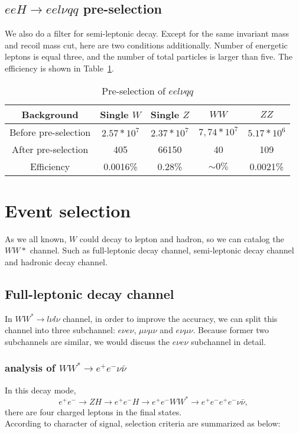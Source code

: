 \documentclass[11pt,a4paper]{cepcnote}
\begin{document}
\subsection{$eeH\rightarrow eel\nu qq$ pre-selection}
We also do a filter for semi-leptonic decay. Except for the same invariant mass and recoil mass cut,
here are two conditions additionally.
Number of energetic leptons is equal three, and the number of total particles is larger than five.
The efficiency is shown in Table~\ref{tab:eehsemi}.
\begin{table}[H]
  \begin{center}
    \begin{tabular}{ccccc}
      \hline \hline
      \multicolumn{1}{c}{Background}      & \multicolumn{1}{c}{Single $W$}&\multicolumn{1}{c}{Single $Z$}
	  &\multicolumn{1}{c}{$WW$}	&\multicolumn{1}{c}{$ZZ$}\\ 
      \hline
      Before pre-selection& $2.57*10^7$ & $2.37*10^7$	&  $7,74*10^7$	&  $5.17*10^6$\\
      \hline
      After pre-selection &  405		 & 	66150		&  40			&  109\\
      \hline
      Efficiency         			&  0.0016\%  &   0.28\%		& $\sim 0\%$	&  0.0021\%\\
      \hline \hline
    \end{tabular}
   \caption[Monte Carlo purities in the single lepton sample]{Pre-selection of $ee l\nu qq$}
  \label{tab:eehsemi}
 \end{center}
\end{table}

\section{Event selection}
As we all known, $W$ could decay to lepton and hadron, so we can catalog the $WW*$ channel.
Such as full-leptonic decay channel, semi-leptonic decay channel and hadronic decay channel.

\subsection{Full-leptonic decay channel}
In $WW^* \rightarrow l\nu l\nu$ channel, in order to improve the accuracy, 
we can split this channel into three subchannel: $e\nu e\nu$, $\mu\nu\mu\nu$ and $e\nu\mu\nu$.
Because former two subchannels are similar, we would discuss the $e\nu e\nu$ subchannel in detail.

\subsubsection{analysis of $WW^* \rightarrow e^+e^-\nu\bar{\nu} $}
In this decay mode,
\begin{equation}
e^+ e^- \rightarrow ZH \rightarrow e^+e^- H \rightarrow e^+e^- WW^* \rightarrow e^+e^-e^+e^- \nu\bar{\nu},
\end{equation}
there are four charged leptons in the final states. \\
According to character of signal, selection criteria are summarized as below:\\
\end{document}
